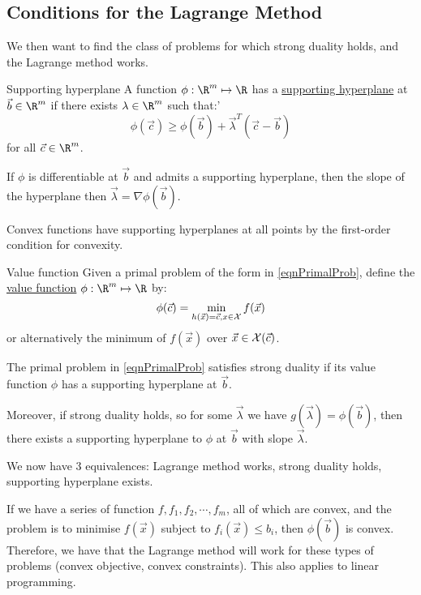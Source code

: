 \documentclass[../Main.tex]{subfiles}
\begin{document}
\subsection{Conditions for the Lagrange Method}
We then want to find the class of problems for which strong duality holds, and the Lagrange method works.
\begin{definition}{Supporting hyperplane}
    A function $\phi : \R^m \mapsto \R$ has a \underline{supporting hyperplane} at $\vec{b} \in \R^m$ if there exists $\lambda \in \R^m$ such that:'
    \begin{equation}
        \phi(\vec{c}) \geq \phi(\vec{b}) + \vec{\lambda}^T (\vec{c} - \vec{b})
        \label{eqnSupportHyperPln}
    \end{equation}
    for all $\vec{c} \in \R^m$.
\end{definition}
\begin{remarks}
    \item If $\phi$ is differentiable at $\vec{b}$ and admits a supporting hyperplane, then the slope of the hyperplane then $\vec{\lambda} = \nabla \phi(\vec{b})$.
    \item Convex functions have supporting hyperplanes at all points by the first-order condition for convexity.
\end{remarks}
\begin{definition}{Value function}
    Given a primal problem of the form in \ref{eqnPrimalProb}, define the \underline{value function} $\phi : \R^m \mapsto \R$ by:
    \begin{equation*}
        \phi(\vec{c}) = \min_{h(\vec{x}) = \vec{c}, x \in \mathcal{X}} f(\vec{x})
    \end{equation*}
    or alternatively the minimum of $f(\vec{x})$ over $\vec{x} \in \mathcal{X}(\vec{c})$.
\end{definition}
\begin{theorem}
    The primal problem in \ref{eqnPrimalProb} satisfies strong duality if its value function $\phi$ has a supporting hyperplane at $\vec{b}$.

    Moreover, if strong duality holds, so for some $\vec{\lambda}$ we have $g(\vec{\lambda}) = \phi(\vec{b})$, then there exists a supporting hyperplane to $\phi$ at $\vec{b}$ with slope $\vec{\lambda}$.
    \label{thmSupportPlane}
\end{theorem}
\begin{remarks}
    \item We now have 3 equivalences: Lagrange method works, strong duality holds, supporting hyperplane exists.
    \item If we have a series of function $f, f_1, f_2, \cdots, f_m$, all of which are convex, and the problem is to minimise $f(\vec{x})$ subject to $f_i(\vec{x}) \leq b_i$, then $\phi(\vec{b})$ is convex. Therefore, we have that the Lagrange method will work for these types of problems (convex objective, convex constraints). This also applies to linear programming.
\end{remarks}
\end{document}
